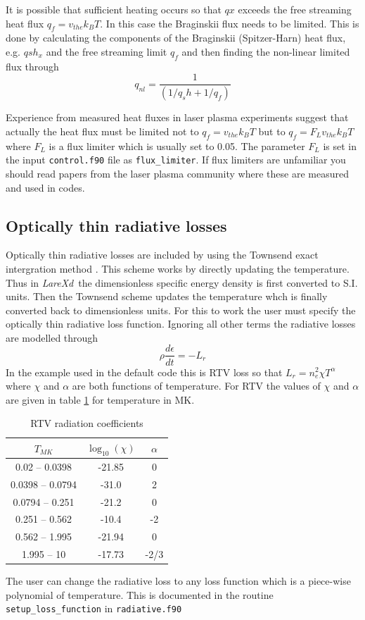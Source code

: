 \documentclass[11pt]{article}
\newcommand{\lare}{{\it LareXd}\ }
\begin{document}
It is possible that sufficient heating occurs so that $qx$ exceeds the free streaming heat flux $q_f=v_{the} k_B T$. In this case the Braginskii flux needs to be limited. This is done by calculating the components of the Braginskii (Spitzer-Harn) heat flux, e.g. $qsh_x$ and the free streaming limit $q_f$ and then finding the non-linear limited flux through
\[
q_{nl} = \frac{1}{(1/q_sh + 1/q_f)}
\]

Experience from measured heat fluxes in laser plasma experiments suggest that actually the heat flux must be limited not to $q_f=v_{the} k_B T$ but to $q_f=F_L v_{the} k_B T$  where $F_L$ is a flux limiter which is usually set to 0.05. The parameter $F_L$ is set in the input \texttt{control.f90} file as \texttt{flux\_limiter}. If flux limiters are unfamiliar you should read papers from the laser plasma community where these are measured and used in codes.

\subsection*{Optically thin radiative losses}
Optically thin radiative losses are included by using the Townsend exact intergration method \cite{townsend:2009}.
This scheme works by directly updating the temperature. Thus in \lare the dimensionless specific energy density
is first converted to S.I. units. Then the Townsend scheme updates the temperature whch is finally converted back to
dimensionless units. For this to work the user must specify the optically thin radiative loss function.
Ignoring all other terms the radiative losses are modelled through
\[
\rho\frac{d\epsilon}{dt}=-L_r
\]
In the example used in the default code this is RTV loss so that $L_r=n_e^2 \chi T^{\alpha}$ where
$\chi$ and $\alpha$ are both functions of temperature. 
For RTV the values of $\chi$ and $\alpha$ are given in table \ref{table:rtv} for temperature in MK.
\begin{table}[ht]
\caption{RTV radiation coefficients}
\centering
\begin{tabular}{c c c}
\hline\hline
$T_{MK}$ & $\log_{10}(\chi)$ & $\alpha$ \\ [0.5ex] %
\hline
0.02 -- 0.0398   & -21.85 & 0 \\
0.0398 -- 0.0794 & -31.0 & 2 \\
0.0794 -- 0.251  & -21.2 & 0  \\
0.251 -- 0.562   & -10.4 & -2 \\
0.562 -- 1.995   & -21.94 & 0 \\
1.995 -- 10      & -17.73 & -2/3   \\[1ex]
\hline
\end{tabular}
\label{table:rtv}
\end{table}
The user can change the radiative loss to any loss function which is a piece-wise polynomial of
temperature. This is documented in the routine {\tt setup\_loss\_function} in {\tt radiative.f90} 
\end{document}
